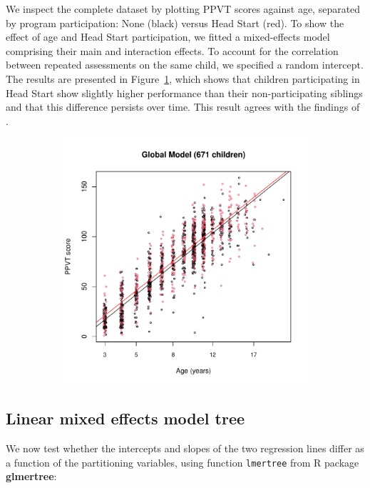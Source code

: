 \documentclass[doc,floatsintext,natbib]{apa7}
\begin{document}
We inspect the complete dataset by plotting PPVT scores against age, separated by program participation: None (black) versus Head Start (red). To show the effect of age and Head Start participation, we fitted a mixed-effects model comprising their main and interaction effects. To account for the correlation between repeated assessments on the same child, we specified a random intercept. The results are presented in Figure~\ref{fig:global_lmm}, which shows that children participating in Head Start show slightly higher performance than their non-participating siblings and that this difference persists over time. This result agrees with the findings of \cite{Demi09}.

\begin{figure}%
\caption{}
\begin{subfigure}{.7\textwidth}
\includegraphics{MOB_paper-004}
\end{subfigure}
\label{fig:global_lmm}
\end{figure}%


\FloatBarrier
\subsection{Linear mixed effects model tree}

We now test whether the intercepts and slopes of the two regression lines differ as a function of the partitioning variables, using function \verb|lmertree| from R package \textbf{glmertree}:
\end{document}
